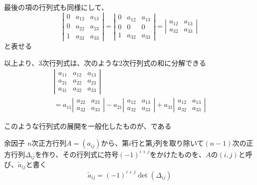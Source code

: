 \documentclass[../../../topic_linear-algebra]{subfiles}
\begin{document}
最後の項の行列式も同様にして、
\begin{equation*}
  \left| \begin{matrix}
    0 & a_{12} & a_{13} \\
    0 & a_{22} & a_{23} \\
    1 & a_{32} & a_{33}
  \end{matrix} \right| = \left| \begin{matrix}
    0 & a_{12} & a_{13} \\
    0 & 0      & 0      \\
    1 & a_{32} & a_{33}
  \end{matrix} \right|= \left| \begin{matrix}
    a_{12} & a_{13} \\
    a_{32} & a_{33}
  \end{matrix} \right|
\end{equation*}
と表せる

\br

以上より、3次行列式は、次のような2次行列式の和に分解できる
\begin{multline*}
  \left| \begin{matrix}
    a_{11} & a_{12} & a_{13} \\
    a_{21} & a_{22} & a_{23} \\
    a_{31} & a_{32} & a_{33}
  \end{matrix} \right| \\ = a_{11} \left| \begin{matrix}
    a_{22} & a_{23} \\
    a_{32} & a_{33}
  \end{matrix} \right| - a_{21} \left| \begin{matrix}
    a_{12} & a_{13} \\
    a_{32} & a_{33}
  \end{matrix} \right| + a_{31} \left| \begin{matrix}
    a_{12} & a_{13} \\
    a_{32} & a_{33}
  \end{matrix} \right|
\end{multline*}

\sectionline

このような行列式の展開を一般化したものが、である

\begin{definition}{余因子}
  $n$次正方行列$A = (a_{ij})$から、第$i$行と第$j$列を取り除いて$(n-1)$次の正方行列$\Delta_{ij}$を作り、その行列式に符号$(-1)^{i+j}$をかけたものを、$A$の$(i,j)$と呼び、$\tilde{a}_{ij}$と書く
  \begin{equation*}
    \tilde{a}_{ij} = (-1)^{i+j} \det(\Delta_{ij})
  \end{equation*}
\end{definition}
\end{document}
